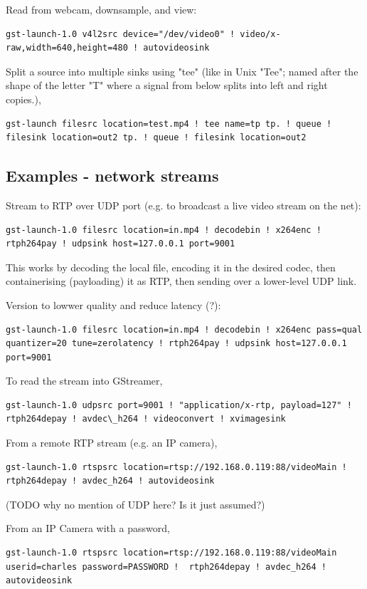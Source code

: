\documentclass[oneside,english]{scrbook}
\begin{document}
Read from webcam, downsample, and view:
\begin{lstlisting}
gst-launch-1.0 v4l2src device="/dev/video0" ! video/x-raw,width=640,height=480 ! autovideosink
\end{lstlisting}

Split a source into multiple sinks using "tee" (like in Unix "Tee"; named after the shape of the letter "T" where a signal from below splits into left and right copies.),

\begin{lstlisting}
gst-launch filesrc location=test.mp4 ! tee name=tp tp. ! queue ! filesink location=out2 tp. ! queue ! filesink location=out2
\end{lstlisting}

\subsection{Examples - network streams}

Stream to RTP over UDP port (e.g. to broadcast a live video stream on the net):
\begin{lstlisting}
gst-launch-1.0 filesrc location=in.mp4 ! decodebin ! x264enc ! rtph264pay ! udpsink host=127.0.0.1 port=9001
\end{lstlisting}
This works by decoding the local file, encoding it in the desired codec, then containerising (payloading) it as RTP, then sending over a lower-level UDP link.

Version to lowwer quality and reduce latency (?):
\begin{lstlisting}
gst-launch-1.0 filesrc location=in.mp4 ! decodebin ! x264enc pass=qual quantizer=20 tune=zerolatency ! rtph264pay ! udpsink host=127.0.0.1 port=9001
\end{lstlisting}

To read the stream into GStreamer,
\begin{lstlisting}
gst-launch-1.0 udpsrc port=9001 ! "application/x-rtp, payload=127" ! rtph264depay ! avdec\_h264 ! videoconvert ! xvimagesink
\end{lstlisting}

From a remote RTP stream (e.g. an IP camera),
\begin{lstlisting}
gst-launch-1.0 rtspsrc location=rtsp://192.168.0.119:88/videoMain !  rtph264depay ! avdec_h264 ! autovideosink
\end{lstlisting}
(TODO why no mention of UDP here? Is it just assumed?)

From an IP Camera with a password,
\begin{lstlisting}
gst-launch-1.0 rtspsrc location=rtsp://192.168.0.119:88/videoMain userid=charles password=PASSWORD !  rtph264depay ! avdec_h264 ! autovideosink
\end{lstlisting}
\end{document}
